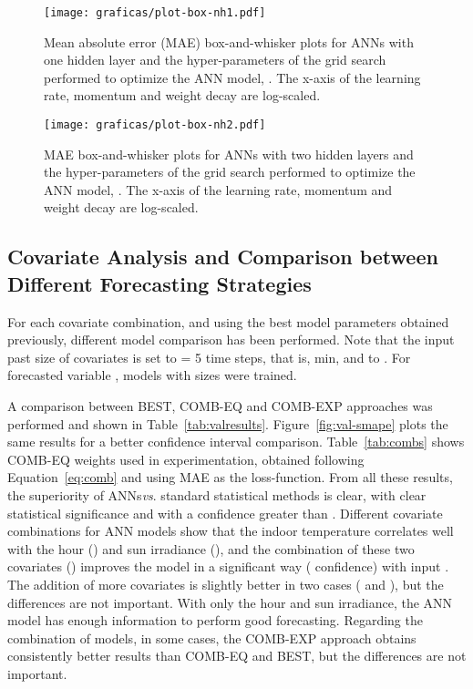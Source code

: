 \documentclass[energies,article,accept,moreauthors,pdftex,12pt,a4paper]{mdpi}
\newcommand{\ann}{ANN\xspace}
\newcommand{\anns}{ANNs\xspace}
\newcommand{\best}{BEST\xspace}
\newcommand{\comb}{COMB-EXP\xspace}
\newcommand{\combeq}{COMB-EQ\xspace}
\begin{document}
\begin{figure}[H]
 \begin{center}
 \texttt{[image: graficas/plot-box-nh1.pdf]}
 \end{center}
 \caption{Mean absolute error
(MAE) box-and-whisker plots for \anns with one hidden layer and
 the hyper-parameters of the grid search performed to optimize the \ann model,
 .  The x-axis of the learning rate, momentum and weight decay are
 log-scaled.}
\label{fig:dhnumh1}
\end{figure}
\vspace {-18 pt}
\begin{figure}[H]
 \begin{center}
 \texttt{[image: graficas/plot-box-nh2.pdf]}
 \end{center}
 \caption{MAE box-and-whisker plots for \anns with two hidden layers
 and the \protect\linebreak hyper-parameters of the grid search performed to optimize the \ann
 model, . \protect\linebreak The x-axis of the learning rate, momentum and weight decay are
 log-scaled.}\label{fig:dhnumh2}
\end{figure}


\newpage

\subsection{Covariate Analysis and Comparison between Different Forecasting Strategies}

For each covariate combination, and using the best model parameters obtained
previously, different model comparison has been performed. Note
that the input past size of covariates is set to \linebreak = 5 time
steps, that is,  min, and to . For forecasted variable ,
models with sizes  were trained.

A comparison between \best, \combeq and \comb approaches was performed and
shown in Table~\ref{tab:valresults}. Figure~\ref{fig:val-smape} plots the same
results for a better confidence interval comparison. Table~\ref{tab:combs} shows
\combeq weights used in experimentation, obtained following
Equation~\ref{eq:comb} and using MAE as the \linebreak loss-function. From all these
results, the superiority of \anns \textit{vs}. standard statistical methods is clear,
with clear statistical significance and with a confidence greater than . Different
covariate combinations for \ann models show that the indoor temperature
correlates well with the hour () and sun irradiance (), and the combination
of these two covariates () improves the model in a significant way (
confidence) with input . The addition of more covariates is slightly
better in two cases ( and ), but the differences are not
important. With only the hour and sun irradiance, the \ann model has enough
information to perform good forecasting. Regarding the combination of models,
in some cases, the \comb approach obtains consistently better results than
\combeq and \best, but the differences are not important.
\end{document}
